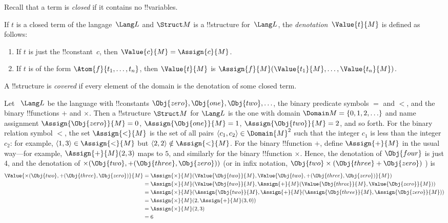 \documentclass[../../include/open-logic-section]{subfiles}
\begin{document}
\begin{explain}
Recall that a term is \emph{closed} if it contains no !!{variable}s.
\end{explain}

\begin{defn}
If $t$ is a closed term of the langage~$\Lang L$ and $\Struct M$ is a
!!{structure} for~$\Lang L$, the \emph{denotation}~$\Value{t}{M}$ is
defined as follows:
\begin{enumerate}
\item If $t$ is just the !!{constant}~$c$, then $\Value{c}{M} = \Assign{c}{M}$.
\item If $t$ is of the form $\Atom{f}{t_1, \ldots, t_n}$, then
  $\Value{t}{M}$ is $\Assign{f}{M}(\Value{t_1}{M}, \ldots,
  \Value{t_n}{M})$.
\end{enumerate}
\end{defn}

\begin{defn}
A !!{structure} is \emph{covered} if every element of the domain is the
denotation of some closed term.
\end{defn}

\begin{ex}
Let ~$\Lang L$ be the language with !!{constant}s $\Obj{zero},
\Obj{one}, \Obj{two}, \ldots$, the binary predicate symbols $=$
and $<$, and the binary !!{function}s $+$ and $\times$.  Then a
!!{structure} $\Struct M$ for $\Lang L$ is the one with domain
$\Domain M = \{0, 1, 2, \ldots \}$ and name assignment
$\Assign{\Obj{zero}}{M} = 0$, $\Assign{\Obj{one}}{M} = 1$,
$\Assign{\Obj{two}}{M} = 2$, and so forth. For the binary relation
symbol $<$, the set $\Assign{<}{M}$ is the set of all pairs $\langle
c_1, c_2 \rangle \in \Domain{M}^2$ such that the integer $c_1$ is less
than the integer $c_2$: for example, $\langle 1, 3 \rangle \in
\Assign{<}{M}$ but $\langle 2, 2 \rangle \notin \Assign{<}{M}$. For the
binary !!{function} $+$, define $\Assign{+}{M}$ in the usual way---for
example, $\Assign{+}{M}(2,3)$ maps to $5$, and similarly for the
binary !!{function} $\times$. Hence, the denotation of $\Obj{four}$
is just 4, and the denotation of $\times(\Obj{two},
+(\Obj{three},\Obj{zero}))$ (or in infix notation, $\Obj{two}
\times (\Obj{three} + \Obj{zero})$ ) is
\begin{align*} 
\Value{\times(\Obj{two}, +(\Obj{three},\Obj{zero})}{M}&=
\Assign{\times}{M}(\Value{\Obj{two}}{M}, \Value{\Obj{two}, 
+(\Obj{three}, \Obj{zero})}{M})\\
&= \Assign{\times}{M}(\Value{\Obj{two}}{M}, \Assign{+}{M}(\Value{\Obj{three}}{M}, 
\Value{\Obj{zero}}{M})) \\
&= \Assign{\times}{M}(\Assign{\Obj{two}}{M}, \Assign{+}{M}(\Assign{\Obj{three}}{M}, 
\Assign{\Obj{zero}}{M})) \\
&= \Assign{\times}{M}(2, \Assign{+}{M}(3, 0)) \\
&= \Assign{\times}{M}(2, 3) \\
&= 6
\end{align*}
\end{ex}
\end{document}
